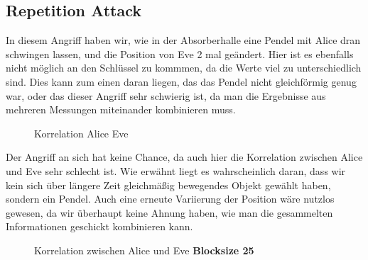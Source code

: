 \documentclass[12pt,a4paper]{article}
\begin{document}
\subsection*{Repetition Attack}
In diesem Angriff haben wir, wie in der Absorberhalle eine Pendel mit Alice dran schwingen lassen, und die Position von Eve 2 mal geändert. Hier ist es ebenfalls nicht möglich an den Schlüssel zu kommmen, da die Werte viel zu unterschiedlich sind. Dies kann zum einen daran liegen, das das Pendel nicht gleichförmig genug war, oder das dieser Angriff sehr schwierig ist, da man die Ergebnisse aus mehreren Messungen miteinander kombinieren muss.
\begin{figure}[H]
\centering
{} \qquad
{}
\caption{Korrelation Alice Eve}
\label{fig:rep1}
\end{figure}
Der Angriff an sich hat keine Chance, da auch hier die Korrelation zwischen Alice und Eve sehr schlecht ist. Wie erwähnt liegt es wahrscheinlich daran, dass wir kein sich über längere Zeit gleichmäßig bewegendes Objekt gewählt haben, sondern ein Pendel. Auch eine erneute Variierung der Position wäre nutzlos gewesen, da wir überhaupt keine Ahnung haben, wie man die gesammelten Informationen geschickt kombinieren kann.
\begin{figure}[H]
\centering
{} \qquad
{}
\caption{Korrelation zwischen Alice und Eve \textbf{Blocksize 25}}
\label{fig:rep2}
\end{figure}
\end{document}
